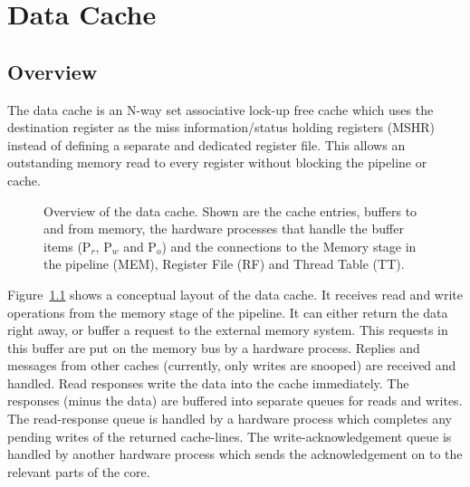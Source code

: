 \chapter{Data Cache}


\section{Overview}
The data cache is an N-way set associative lock-up free \cite{Kroft} cache which uses the destination register as the miss information/status holding registers (MSHR) instead of defining a separate and dedicated register file. This allows an outstanding memory read to every register without blocking the pipeline or cache.

\begin{figure}
 \begin{center}
  
  \caption{Overview of the data cache. Shown are the cache entries, buffers to and from memory, the hardware processes that handle the buffer items (P$_r$, P$_w$ and P$_o$) and the connections to the Memory stage in the pipeline (MEM), Register File (RF) and Thread Table (TT).}
  \label{fig:dcache-overview}
 \end{center}
\end{figure}

Figure~\ref{fig:dcache-overview} shows a conceptual layout of the data cache. It receives read and write operations from the memory stage of the pipeline. It can either return the data right away, or buffer a request to the external memory system. This requests in this buffer are put on the memory bus by a hardware process. Replies and messages from other caches (currently, only writes are snooped) are received and handled. Read responses write the data into the cache immediately. The responses (minus the data) are buffered into separate queues for reads and writes. The read-response queue is handled by a hardware process which completes any pending writes of the returned cache-lines. The write-acknowledgement queue is handled by another hardware process which sends the acknowledgement on to the relevant parts of the core.


